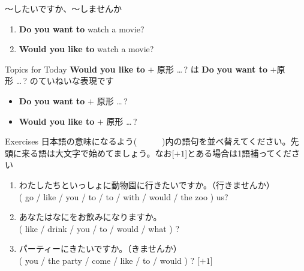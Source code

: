 \documentclass[aspectratio=169,xcolor={dvipsnames,table}]{beamer}
\begin{document}
\begin{frame}[plain]{～したいですか、～しませんか}
\large
 \begin{enumerate}
  \item \textbf{Do you want to} watch a movie?
  \item \textbf{Would you like to} watch a movie?
 \end{enumerate}

\begin{block}{Topics for Today}\small
\textbf{Would you like to} $+$ 原形\,\,\ldots\,?\,\,は\,\,\textbf{Do you want to} $+$原形\,\,\ldots\,?\,\,のていねいな表現です
\begin{itemize}[square]\small
 \item \textbf{Do you want to} $+$ 原形 \ldots\,?
 \item \textbf{Would you like to} $+$ 原形 \ldots\,?
       \end{itemize}
\end{block}
\hfill{\scriptsize {}}

\end{frame}
\begin{frame}[plain]{Exercises}
日本語の意味になるよう(~~~~~~)内の語句を並べ替えてください。先頭に来る語は大文字で始めてましょう。なお[$+1$]とある場合は1語補ってください

 \begin{enumerate}
  \item わたしたちといっしょに動物園に行きたいですか。（行きませんか）\\
( go / like / you / to / to / with / would / the zoo ) us?\\
  \item あなたはなにをお飲みになりますか。\\
( like / drink / you / to / would / what ) ?\\
  \item パーティーにきたいですか。（きませんか）\\
( you / the party / come / like / to / would ) ? [$+1$]\\
 
\end{enumerate}
\hfill{\scriptsize {}}

\end{frame}
\end{document}
